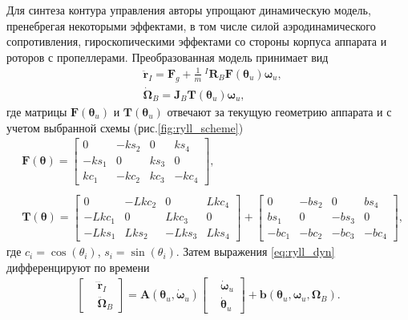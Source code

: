 Для синтеза контура управления авторы упрощают динамическую модель, пренебрегая некоторыми эффектами,
в том числе силой аэродинамического сопротивления, гироскопическими эффектами со стороны корпуса аппарата и роторов с пропеллерами. Преобразованная модель принимает вид
\begin{equation} \label{eq:ryll_dyn}
\begin{aligned}
&\ddot{\bm r}_I = \bm F_g + \frac{1}{m}~^I \bm R_B \bm F(\bm \theta_u) \bm \omega_u,
\\
&\dot {\bm \Omega}_B = \bm J_B \bm T(\bm \theta_u) \bm \omega_u,
\end{aligned}
\end{equation}
где матрицы $\bm F(\bm \theta_u)$ и $\bm T(\bm \theta_u)$ отвечают за текущую геометрию аппарата и с учетом выбранной схемы (рис.\ref{fig:ryll_scheme}) 
\begin{equation} \label{eq:ryl_dyn_matrixes}
\begin{aligned}
&\bm F(\bm \theta) =
\begin{bmatrix}
0&-ks_2&0&ks_4\\
-ks_1&0&ks_3&0\\
kc_1&-kc_2&kc_3&-kc_4
\end{bmatrix},
\\
\phantom{}
\\
&\bm T(\bm \theta) =
\begin{bmatrix}
0&-Lkc_2&0&Lkc_4\\
-Lkc_1&0&Lkc_3&0\\
-Lks_1&Lks_2&-Lks_3&Lks_4
\end{bmatrix}
+
\begin{bmatrix}
0&-bs_2&0&bs_4\\
bs_1&0&-bs_3&0\\
-bc_1&-bc_2&-bc_3&-bc_4
\end{bmatrix}, 
\end{aligned}
\end{equation}
где $c_i = \cos(\theta_i)$, $s_i = \sin(\theta_i)$.
Затем выражения \eqref{eq:ryll_dyn} дифференцируют по времени
\begin{equation} \label{eq:ryll_dyn_dot}
\begin{aligned}
\begin{bmatrix}
&\dddot{\bm r}_I
\\
&\ddot{\bm \Omega}_B
\end{bmatrix}
=
\bm A(\bm \theta_u, \dot {\bm \omega}_u)
\begin{bmatrix}
&\dot{\bm \omega}_u
\\
&\dot{\bm \theta}_u
\end{bmatrix}
+
\bm b(\bm \theta_u, \bm \omega_u, \bm \Omega_B).
\end{aligned}
\end{equation}
